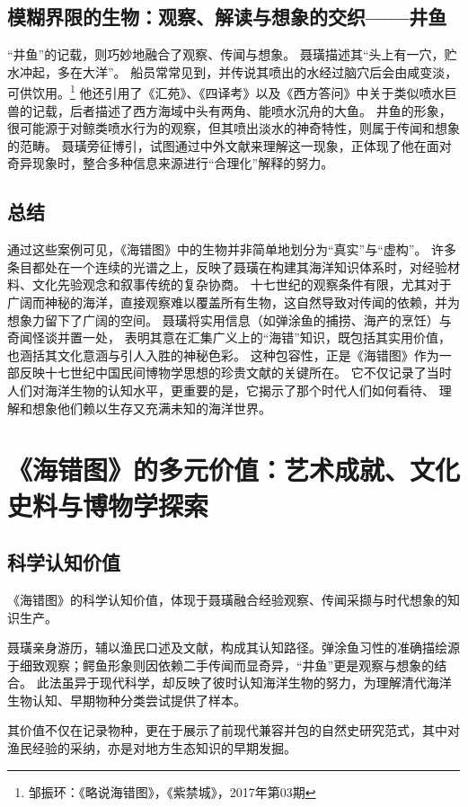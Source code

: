 \documentclass{source/Paper}
\begin{document}
\subsection{模糊界限的生物：观察、解读与想象的交织——井鱼}
“井鱼”的记载，则巧妙地融合了观察、传闻与想象。
聂璜描述其“头上有一穴，贮水冲起，多在大洋”。
船员常常见到，并传说其喷出的水经过脑穴后会由咸变淡，可供饮用。\footnote{邹振环：《略说海错图》，《紫禁城》，2017年第03期}
他还引用了《汇苑》、《四译考》以及《西方答问》中关于类似喷水巨兽的记载，后者描述了西方海域中头有两角、能喷水沉舟的大鱼。
井鱼的形象，很可能源于对鲸类喷水行为的观察，但其喷出淡水的神奇特性，则属于传闻和想象的范畴。
聂璜旁征博引，试图通过中外文献来理解这一现象，正体现了他在面对奇异现象时，整合多种信息来源进行“合理化”解释的努力。
\subsection{总结}
通过这些案例可见，《海错图》中的生物并非简单地划分为“真实”与“虚构”。
许多条目都处在一个连续的光谱之上，反映了聂璜在构建其海洋知识体系时，对经验材料、文化先验观念和叙事传统的复杂协商。
十七世纪的观察条件有限，尤其对于广阔而神秘的海洋，直接观察难以覆盖所有生物，这自然导致对传闻的依赖，并为想象力留下了广阔的空间。
聂璜将实用信息（如弹涂鱼的捕捞、海产的烹饪）与奇闻怪谈并置一处，
表明其意在汇集广义上的“海错”知识，既包括其实用价值，
也涵括其文化意涵与引人入胜的神秘色彩。
这种包容性，正是《海错图》作为一部反映十七世纪中国民间博物学思想的珍贵文献的关键所在。
它不仅记录了当时人们对海洋生物的认知水平，更重要的是，它揭示了那个时代人们如何看待、
理解和想象他们赖以生存又充满未知的海洋世界。
\section{《海错图》的多元价值：艺术成就、文化史料与博物学探索}
\subsection{科学认知价值}
《海错图》的科学认知价值，体现于聂璜融合经验观察、传闻采撷与时代想象的知识生产。

聂璜亲身游历，辅以渔民口述及文献，构成其认知路径。弹涂鱼习性的准确描绘源于细致观察；鳄鱼形象则因依赖二手传闻而显奇异，“井鱼”更是观察与想象的结合。
此法虽异于现代科学，却反映了彼时认知海洋生物的努力，为理解清代海洋生物认知、早期物种分类尝试提供了样本。

其价值不仅在记录物种，更在于展示了前现代兼容并包的自然史研究范式，其中对渔民经验的采纳，亦是对地方生态知识的早期发掘。
\end{document}

